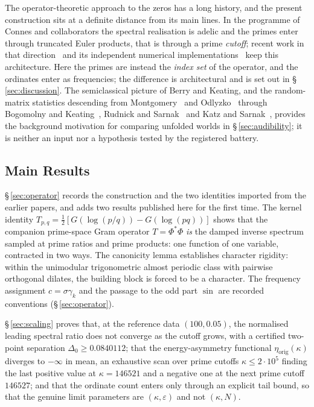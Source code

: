 \documentclass[11pt]{article}
\begin{document}
The operator-theoretic approach to the zeros has a long history, and the
present construction sits at a definite distance from its main lines. In the
programme of Connes and collaborators the spectral realisation is adelic and
the primes enter through truncated Euler products, that is through a prime
\emph{cutoff}; recent work in that direction~\cite{Connes26,ConnesVS25} and
its independent numerical implementations~\cite{Groskin26a} keep this
architecture. Here the primes are instead the \emph{index set} of the
operator, and the ordinates enter as frequencies; the difference is
architectural and is set out in \S\,\ref{sec:discussion}. The
semiclassical picture of Berry and Keating, and the random-matrix statistics
descending from Montgomery~\cite{Montgomery73} and
Odlyzko~\cite{Odlyzko87} through
Bogomolny and Keating~\cite{BogomolnyKeating96},
Rudnick and Sarnak~\cite{RudnickSarnak96} and
Katz and Sarnak~\cite{KatzSarnak99}, provides the background motivation for
comparing unfolded worlds in \S\,\ref{sec:audibility}; it is neither an input
nor a hypothesis tested by the registered battery.

\subsection{Main Results}

\S\,\ref{sec:operator} records the construction and the two identities
imported from the earlier papers, and adds two results published here for the
first time. The kernel identity
$T_{p,q}=\tfrac12[G(\log(p/q))-G(\log(pq))]$ shows that the companion
prime-space Gram operator $T=\Phi^{*}\Phi$ \emph{is} the damped inverse
spectrum sampled at prime ratios and prime products: one function of one
variable, contracted in two ways. The canonicity
lemma establishes character rigidity: within the unimodular trigonometric
almost periodic class with pairwise orthogonal dilates, the building block is
forced to be a character. The frequency assignment $c=\sigma\gamma_k$ and the
passage to the odd part $\sin$ are recorded conventions
(\S\,\ref{sec:operator}).

\S\,\ref{sec:scaling} proves that, at the reference data $(100,0.05)$, the
normalised leading spectral ratio does not converge as the cutoff grows,
with a certified two-point separation
$\Delta_0\ge 0.0840112$; that the energy-asymmetry functional
$\eta_{\mathrm{orig}}(\kappa)$ diverges to $-\infty$ in mean, an exhaustive
scan over prime cutoffs $\kappa\le2\cdot10^{5}$ finding the last positive
value at $\kappa=146521$ and a negative one at the next prime cutoff
$146527$; and that the ordinate count
enters only through an explicit tail bound, so that the genuine limit
parameters are $(\kappa,\varepsilon)$ and not $(\kappa,N)$.
\end{document}
